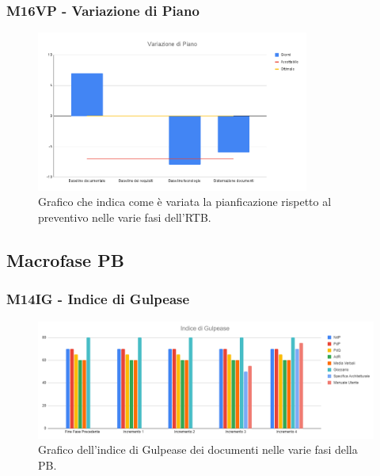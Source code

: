 \subsubsection{M16VP - Variazione di Piano}
\begin{figure}[H]
    \centering\includegraphics[width=0.8\textwidth, height=0.8\textheight,keepaspectratio]{images/RTB-Variazione-di-Piano.png}
    \caption{Grafico che indica come è variata la pianficazione rispetto al preventivo nelle varie fasi dell'RTB.}
\end{figure}  


\subsection{Macrofase PB}
\subsubsection{M14IG - Indice di Gulpease}
\begin{figure}[H]
    \centering\includegraphics[width=\textwidth, height=\textheight,keepaspectratio]{images/PB-Indice-di-Gulpease.png}
    \caption{Grafico dell'indice di Gulpease dei documenti nelle varie fasi della PB.}
\end{figure}    

